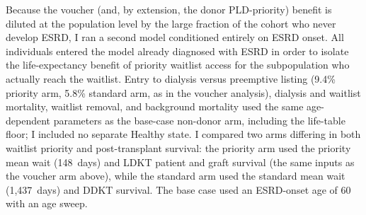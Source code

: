 Because the voucher (and, by extension, the donor PLD-priority) benefit is diluted at the population level by the large fraction of the cohort who never develop ESRD, I ran a second model conditioned entirely on ESRD onset. All individuals entered the model already diagnosed with ESRD in order to isolate the life-expectancy benefit of priority waitlist access for the subpopulation who actually reach the waitlist. Entry to dialysis versus preemptive listing (9.4\% priority arm, 5.8\% standard arm, as in the voucher analysis), dialysis and waitlist mortality, waitlist removal, and background mortality used the same age-dependent parameters as the base-case non-donor arm, including the life-table floor; I included no separate Healthy state. I compared two arms differing in both waitlist priority and post-transplant survival: the priority arm used the priority mean wait (148~days) and LDKT patient and graft survival (the same inputs as the voucher arm above), while the standard arm used the standard mean wait (1{,}437~days) and DDKT survival. The base case used an ESRD-onset age of 60 with an age sweep.

